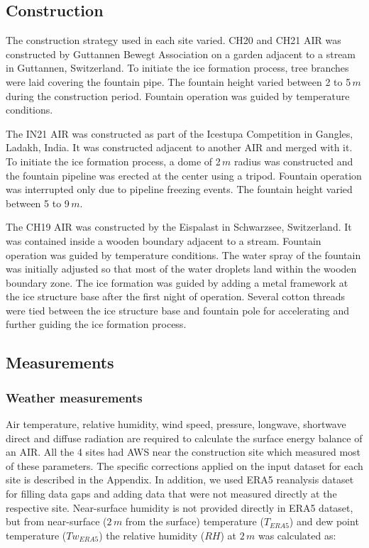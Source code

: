 \documentclass[utf8]{frontiersSCNS} %
\begin{document}
\subsection{Construction} 
The construction strategy used in each site varied. CH20 and CH21 AIR was constructed by Guttannen Bewegt Association on
a garden adjacent to a stream in Guttannen, Switzerland. To initiate the ice formation process, tree branches were laid
covering the fountain pipe.  The fountain height varied between 2 to 5\,$m$ during the construction period. Fountain
operation was guided by temperature conditions. 

The IN21 AIR was constructed as part of the Icestupa Competition in Gangles, Ladakh, India. It was constructed adjacent
to another AIR and merged with it. To initiate the ice formation process, a dome of 2\,$m$ radius was constructed and
the fountain pipeline was erected at the center using a tripod. Fountain operation was interrupted only due to pipeline
freezing events. The fountain height varied between 5 to 9\,$m$.

The CH19 AIR was constructed by the Eispalast in Schwarzsee, Switzerland. It was contained inside a wooden boundary
adjacent to a stream. Fountain operation was guided by temperature conditions.  The water spray of the fountain was
initially adjusted so that most of the water droplets land within the wooden boundary zone. The ice formation was guided
by adding a metal framework at the ice structure base after the first night of operation.  Several cotton threads were
tied between the ice structure base and fountain pole for accelerating and further guiding the ice formation process. 

\subsection{Measurements}

\subsubsection{Weather measurements} 
Air temperature, relative humidity, wind speed, pressure, longwave, shortwave direct and diffuse radiation are required
to calculate the surface energy balance of an AIR. All the 4 sites had AWS near the construction site which measured
most of these parameters. The specific corrections applied on the input dataset for each site is described in the
Appendix. In addition, we used ERA5 reanalysis dataset \citep{era5} for filling data gaps and adding
data that were not measured directly at the respective site. Near-surface humidity is not provided directly in ERA5
dataset, but from near-surface ($2\,m$ from the surface) temperature ($T_{ERA5}$) and dew point temperature
($Tw_{ERA5}$) the relative humidity ($RH$) at $2\,m$  was calculated as: 
\end{document}
